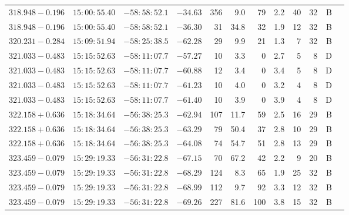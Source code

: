 {\begin{longtable}{c rrr rrrrr rr c}
    $318.948-0.196$     &   $15:00:55.40$     &   $-58:58:52.1$     &   $-34.63  $    &   356    &    9.0    &    79  &   2.2 &   40  &   32  &   B   \\
    $318.948-0.196$     &   $15:00:55.40$     &   $-58:58:52.1$     &   $-36.30  $    &   31     &   34.8    &    32  &   1.9 &   12  &   32  &   B   \\
    $320.231-0.284$     &   $15:09:51.94$     &   $-58:25:38.5$     &   $-62.28  $    &   29     &    9.9    &    21  &   1.3 &   7   &   32  &   B   \\
    $321.033-0.483$     &   $15:15:52.63$     &   $-58:11:07.7$     &   $-57.27  $    &   10     &    3.3    &    0   &   2.7 &   5   &   8   &   D   \\
    $321.033-0.483$     &   $15:15:52.63$     &   $-58:11:07.7$     &   $-60.88  $    &   12     &    3.4    &    0   &   3.4 &   5   &   8   &   D   \\
    $321.033-0.483$     &   $15:15:52.63$     &   $-58:11:07.7$     &   $-61.23  $    &   10     &    4.0    &    0   &   3.2 &   4   &   8   &   D   \\
    $321.033-0.483$     &   $15:15:52.63$     &   $-58:11:07.7$     &   $-61.40  $    &   10     &    3.9    &    0   &   3.9 &   4   &   8   &   D   \\
    $322.158+0.636$     &   $15:18:34.64$     &   $-56:38:25.3$     &   $-62.94  $    &   107    &   11.7    &    59  &   2.5 &   16  &   29  &   B   \\
    $322.158+0.636$     &   $15:18:34.64$     &   $-56:38:25.3$     &   $-63.29  $    &   79     &   50.4    &    37  &   2.8 &   10  &   29  &   B   \\
    $322.158+0.636$     &   $15:18:34.64$     &   $-56:38:25.3$     &   $-64.08  $    &   74     &   54.7    &    51  &   2.8 &   13  &   29  &   B   \\
    $323.459-0.079$     &   $15:29:19.33$     &   $-56:31:22.8$     &   $-67.15  $    &   70     &   67.2    &    42  &   2.2 &   9   &   20  &   B   \\
    $323.459-0.079$     &   $15:29:19.33$     &   $-56:31:22.8$     &   $-68.29  $    &   124    &    8.3    &    65  &   1.9 &   25  &   32  &   B   \\
    $323.459-0.079$     &   $15:29:19.33$     &   $-56:31:22.8$     &   $-68.99  $    &   112    &    9.7    &    92  &   3.3 &   12  &   32  &   B   \\
    $323.459-0.079$     &   $15:29:19.33$     &   $-56:31:22.8$     &   $-69.26  $    &   227    &   81.6    &    100 &   3.8 &   15  &   32  &   B   \\

\end{longtable}}
